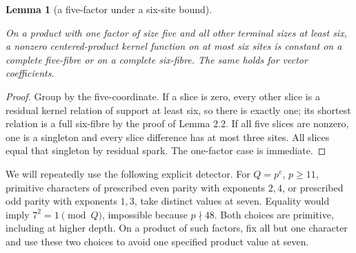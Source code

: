 \documentclass[11pt]{amsart}
\numberwithin{theorem}{section}
\newtheorem{lemma}[theorem]{Lemma}
\theoremstyle{remark}
\numberwithin{equation}{section}
\begin{document}
\begin{lemma}[a five-factor under a six-site bound]\label{lemma:2.4}

On a product with one factor of size five and all other terminal sizes at
least six, a nonzero centered-product kernel function on at most six sites
is constant on a complete five-fibre or on a complete six-fibre. The same
holds for vector coefficients.

\end{lemma}
\begin{proof}

Group by the five-coordinate. If a slice is zero, every other slice is a
residual kernel relation of support at least six, so there is exactly one;
its shortest relation is a full six-fibre by the proof of Lemma 2.2.
If all five slices are nonzero, one is a singleton and every slice
difference has at most three sites. All slices equal that singleton by
residual spark. The one-factor case is immediate.
\end{proof}

We will repeatedly use the following explicit detector. For \(Q=p^e\),
\(p\ge11\), primitive characters of prescribed even parity with exponents
\(2,4\), or prescribed odd parity with exponents \(1,3\), take distinct
values at seven. Equality would imply \(7^2=1\pmod Q\), impossible because
\(p\nmid48\). Both choices are primitive, including at higher depth.
On a product of such factors, fix all but one character and use these two
choices to avoid one specified product value at seven.
\end{document}
